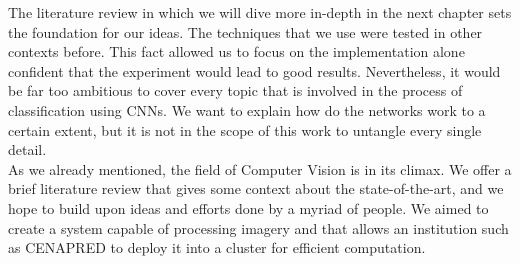 The literature review in which we will dive more in-depth in the next chapter sets the foundation for our ideas. The techniques that we use were tested in other contexts before. This fact allowed us to focus on the implementation alone confident that the experiment would lead to good results. Nevertheless, it would be far too ambitious to cover every topic that is involved in the process of classification using CNNs. We want to explain how do the networks work to a certain extent, but it is not in the scope of this work to untangle every single detail.\\

As we already mentioned, the field of Computer Vision is in its climax. We offer a brief literature review that gives some context about the state-of-the-art, and we hope to build upon ideas and efforts done by a myriad of people. We aimed to create a system capable of processing imagery and that allows an institution such as CENAPRED to deploy it into a cluster for efficient computation.\\